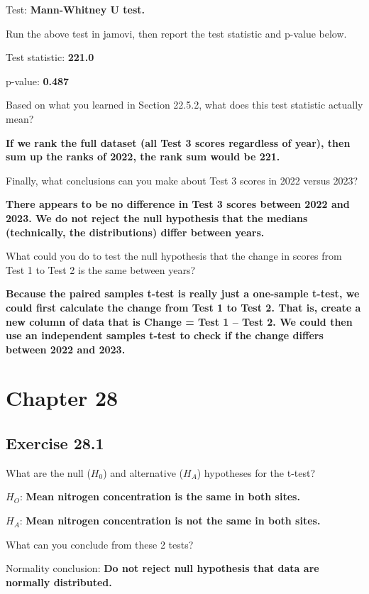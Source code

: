 \documentclass[
  openany]{krantz}
\begin{document}
Test: \textbf{Mann-Whitney U test.}

Run the above test in jamovi, then report the test statistic and p-value below.

Test statistic: \textbf{221.0}

p-value: \textbf{0.487}

Based on what you learned in Section 22.5.2, what does this test statistic actually mean?

\textbf{If we rank the full dataset (all Test 3 scores regardless of year), then sum up the ranks of 2022, the rank sum would be 221.}

Finally, what conclusions can you make about Test 3 scores in 2022 versus 2023?

\textbf{There appears to be no difference in Test 3 scores between 2022 and 2023. We do not reject the null hypothesis that the medians (technically, the distributions) differ between years.}

What could you do to test the null hypothesis that the change in scores from Test 1 to Test 2 is the same between years?

\textbf{Because the paired samples t-test is really just a one-sample t-test, we could first calculate the change from Test 1 to Test 2. That is, create a new column of data that is Change = Test 1 -- Test 2. We could then use an independent samples t-test to check if the change differs between 2022 and 2023.}

\hypertarget{chapter-28}{%
\section{Chapter 28}\label{chapter-28}}

\hypertarget{exercise-28.1}{%
\subsection{Exercise 28.1}\label{exercise-28.1}}

What are the null (\(H_{0}\)) and alternative (\(H_{A}\)) hypotheses for the t-test?

\(H_{O}\): \textbf{Mean nitrogen concentration is the same in both sites.}

\(H_{A}\): \textbf{Mean nitrogen concentration is not the same in both sites.}

What can you conclude from these 2 tests?

Normality conclusion: \textbf{Do not reject null hypothesis that data are normally distributed.}
\end{document}
